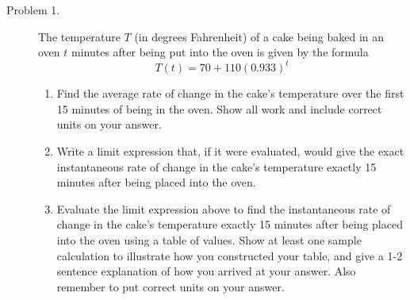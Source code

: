 \documentclass[addpoints]{exam}
\begin{document}
\begin{description}



\hrulefill

	\item[Problem 1.] The temperature $T$ (in degrees Fahrenheit) of a cake being baked in an oven $t$ minutes after being put into the oven is given by the formula 
	$$T(t) = 70 + 110(0.933)^t$$
	\begin{enumerate}
		\item Find the average rate of change in the cake's temperature over the first 15 minutes of being in the oven. Show all work and include correct units on your answer. 
		\item Write a limit expression that, if it were evaluated, would give the exact instantaneous rate of change in the cake's temperature exactly 15 minutes after being placed into the oven. 
		\item Evaluate the limit expression above to find the instantaneous rate of change in the cake's temperature exactly 15 minutes after being placed into the oven using a table of values. Show at least one sample calculation to illustrate how you constructed your table, and give a 1-2 sentence explanation of how you arrived at your answer. Also remember to put correct units on your answer. 
	\end{enumerate}




\end{description}
\end{document}
